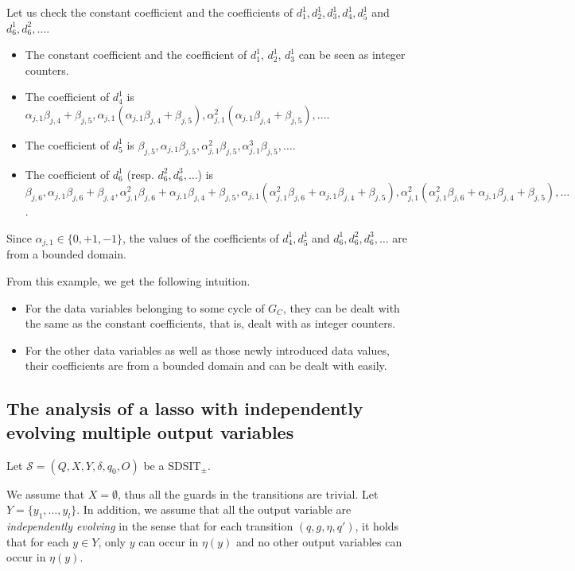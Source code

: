 \documentclass[runningheads,a4paper]{llncs}
\def\Ss{{\mathcal{S} }}
\newcommand{\SDSIT}{SDSIT}
\begin{document}
Let us check the constant coefficient and the coefficients of $d^1_1,d^1_2,d^1_3,d^1_4,d^1_5$ and $d^1_6,d^2_6,\dots$.

\begin{itemize}
\item The constant coefficient and the coefficient of $d^1_1$, $d^1_2$, $d^1_3$ can be seen as integer counters.  

\item The coefficient of $d^1_4$ is $\alpha_{j,1} \beta_{j,4}+\beta_{j,5}, \alpha_{j,1}(\alpha_{j,1} \beta_{j,4}+\beta_{j,5}), \alpha^2_{j,1}(\alpha_{j,1} \beta_{j,4}+\beta_{j,5}), \dots$.

\item The coefficient of $d^1_5$ is $\beta_{j,5},\alpha_{j,1}\beta_{j,5}, \alpha^2_{j,1}\beta_{j,5},\alpha^3_{j,1}\beta_{j,5},\dots$.

\item The coefficient of $d^1_6$ (resp. $d^2_6,d^3_6,\dots$) is $\beta_{j,6}, \alpha_{j,1}\beta_{j,6}+\beta_{j,4}, \alpha^2_{j,1}\beta_{j,6}+\alpha_{j,1}\beta_{j,4}+\beta_{j,5}, \alpha_{j,1}(\alpha^2_{j,1}\beta_{j,6}+\alpha_{j,1}\beta_{j,4}+\beta_{j,5}),\alpha^2_{j,1}(\alpha^2_{j,1}\beta_{j,6}+\alpha_{j,1}\beta_{j,4}+\beta_{j,5}),\dots$.
\end{itemize}
Since $\alpha_{j,1} \in\{0,+1,-1\}$, the values of the coefficients of $d^1_4,d^1_5$ and $d^1_6,d^2_6,d^3_6,\dots$ are from a bounded domain.

From this example, we get the following intuition.
%
\begin{itemize}
\item For the data variables belonging to some cycle of $G_C$, they can be dealt with the same as the constant coefficients, that is, dealt with as integer counters.

\item For the other data variables as well as those newly introduced data values, their coefficients are from a bounded domain and can be dealt with easily.
\end{itemize}


\subsection{The analysis of a lasso with independently evolving multiple output variables}

Let $\Ss=(Q, X, Y, \delta, q_0, O)$ be a \SDSIT$_{\pm}$. 

We assume that $X=\emptyset$, thus all the guards in the transitions are trivial. Let $Y=\{y_1,\dots,y_l\}$. In addition, we assume that all the output variable are \emph{independently evolving} in the sense that for each transition $(q,g, \eta, q')$, it holds that for each $y \in Y$, only $y$ can occur in $\eta(y)$ and no other output variables can occur in $\eta(y)$. 
\end{document}
